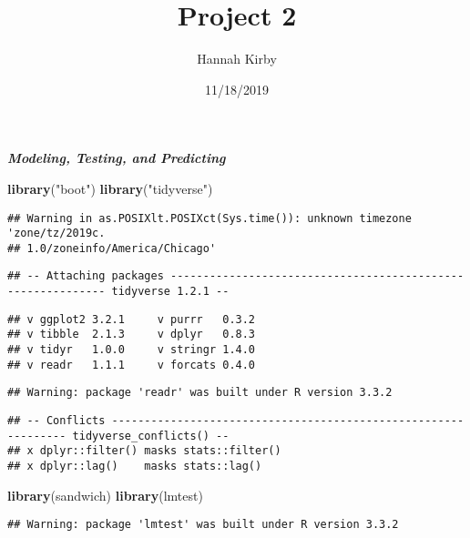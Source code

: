 \documentclass[]{article}
\title{Project 2}
\author{Hannah Kirby}
\date{11/18/2019}
\newenvironment{Shaded}{\begin{snugshade}}{\end{snugshade}}
\newcommand{\KeywordTok}[1]{\textcolor[rgb]{0.13,0.29,0.53}{\textbf{#1}}}
\newcommand{\NormalTok}[1]{#1}
\newcommand{\StringTok}[1]{\textcolor[rgb]{0.31,0.60,0.02}{#1}}
\begin{document}
\maketitle

\textbf{\emph{Modeling, Testing, and Predicting}}

\begin{Shaded}
\begin{Highlighting}[]
\KeywordTok{library}\NormalTok{(}\StringTok{"boot"}\NormalTok{)}
\KeywordTok{library}\NormalTok{(}\StringTok{"tidyverse"}\NormalTok{)}
\end{Highlighting}
\end{Shaded}

\begin{verbatim}
## Warning in as.POSIXlt.POSIXct(Sys.time()): unknown timezone 'zone/tz/2019c.
## 1.0/zoneinfo/America/Chicago'
\end{verbatim}

\begin{verbatim}
## -- Attaching packages ------------------------------------------------------------ tidyverse 1.2.1 --
\end{verbatim}

\begin{verbatim}
## v ggplot2 3.2.1     v purrr   0.3.2
## v tibble  2.1.3     v dplyr   0.8.3
## v tidyr   1.0.0     v stringr 1.4.0
## v readr   1.1.1     v forcats 0.4.0
\end{verbatim}

\begin{verbatim}
## Warning: package 'readr' was built under R version 3.3.2
\end{verbatim}

\begin{verbatim}
## -- Conflicts --------------------------------------------------------------- tidyverse_conflicts() --
## x dplyr::filter() masks stats::filter()
## x dplyr::lag()    masks stats::lag()
\end{verbatim}

\begin{Shaded}
\begin{Highlighting}[]
\KeywordTok{library}\NormalTok{(sandwich)}
\KeywordTok{library}\NormalTok{(lmtest)}
\end{Highlighting}
\end{Shaded}

\begin{verbatim}
## Warning: package 'lmtest' was built under R version 3.3.2
\end{verbatim}
\end{document}
